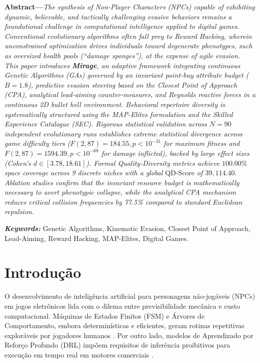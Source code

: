 \documentclass[10pt,conference,twocolumn]{article}
\begin{document}
\medskip
\noindent\textbf{Abstract---}\textit{The synthesis of Non-Player Characters (NPCs) capable of exhibiting dynamic, believable, and tactically challenging evasive behaviors remains a foundational challenge in computational intelligence applied to digital games. Conventional evolutionary algorithms often fall prey to Reward Hacking, wherein unconstrained optimization drives individuals toward degenerate phenotypes, such as oversized health pools (``damage sponges''), at the expense of agile evasion. This paper introduces \textbf{Mirage}, an adaptive framework integrating continuous Genetic Algorithms (GAs) governed by an invariant point-buy attribute budget ($B = 1.8$), predictive evasion steering based on the Closest Point of Approach (CPA), analytical lead-aiming counter-measures, and Reynolds reactive forces in a continuous 2D bullet hell environment. Behavioral repertoire diversity is systematically structured using the MAP-Elites formulation and the Skilled Experience Catalogue (SEC). Rigorous statistical validation across $N = 90$ independent evolutionary runs establishes extreme statistical divergence across game difficulty tiers ($F(2, 87) = 184.55, p < 10^{-31}$ for maximum fitness and $F(2, 87) = 1594.39, p < 10^{-68}$ for damage inflicted), backed by large effect sizes (Cohen's $d \in [3.78, 18.61]$). Formal Quality-Diversity metrics achieve $100.00\%$ space coverage across 9 discrete niches with a global $\text{QD-Score}$ of $39,114.40$. Ablation studies confirm that the invariant resource budget is mathematically necessary to avert phenotypic collapse, while the analytical CPA mechanism reduces critical collision frequencies by 77.5\% compared to standard Euclidean repulsion.}

\smallskip
\noindent\textbf{\textit{Keywords:}} Genetic Algorithms, Kinematic Evasion, Closest Point of Approach, Lead-Aiming, Reward Hacking, MAP-Elites, Digital Games.

\section{Introdução}
O desenvolvimento de inteligência artificial para personagens não-jogáveis (NPCs) em jogos eletrônicos lida com o dilema entre previsibilidade mecânica e custo computacional. Máquinas de Estados Finitos (FSM) e Árvores de Comportamento, embora determinísticas e eficientes, geram rotinas repetitivas exploráveis por jogadores humanos \cite{glavin2015skilled}. Por outro lado, modelos de Aprendizado por Reforço Profundo (DRL) impõem requisitos de inferência proibitivos para execução em tempo real em motores comerciais \cite{motta2016online}.
\end{document}

